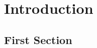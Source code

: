 
\chapter{Introduction} %

\label{ch:introduction} %


\lipsum[1]


\section{First Section}

\lipsum[2]

